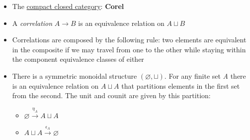\begin{itemize}
    \item The \href{doc/1 math/Seven Sketches in Compositionality/Chapter 4: Co-design/5 Profunctors form a compact closed category/1 Compact closed categories/2 Compact closed SMC}{compact closed category}: \textbf{Corel}
    \item A \emph{correlation} $A \rightarrow B$ is an equivalence relation on $A \sqcup B$
    \item Correlations are composed by the following rule: two elements are equivalent in the composite if we may travel from one to the other while staying within the component equivalence classes of either
    \item There is a symmetric monoidal structure $(\varnothing, \sqcup)$. For any finite set \emph{A} there is an equivalence relation on $A \sqcup A$ that partitions elements in the first set from the second. The unit and counit are given by this partition:
          \begin{itemize}
            \item $\varnothing \xrightarrow{\eta_A} A \sqcup A$
            \item $A \sqcup A \xrightarrow{\epsilon_A} \varnothing$
          \end{itemize}
  \end{itemize}

